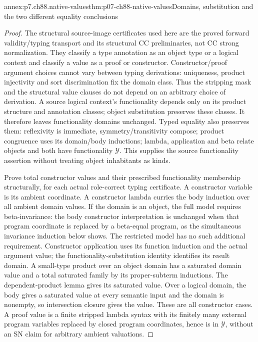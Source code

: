 \begin{annexitem}{annex:p7.ch88.native-values}{thm:p07-ch88-native-values}{Domains, substitution and the two different equality conclusions}
\begin{proof}
The structural source-image certificates used here are the proved
forward validity/typing transport and its structural CC preliminaries,
not CC strong normalization. They classify a type annotation as an
object type or a logical context and classify a value as a proof or
constructor. Constructor/proof argument choices cannot vary between
typing derivations: uniqueness, product injectivity and sort discrimination
fix the domain class. Thus the stripping mask and the structural value
clauses do not depend on an arbitrary choice of derivation. A source
logical context's functionality depends only on its product structure
and annotation classes; object substitution preserves these classes.
It therefore leaves functionality domains unchanged. Typed equality
also preserves them: reflexivity is immediate, symmetry/transitivity
compose; product congruence uses its domain/body inductions; lambda,
application and beta relate objects and both have functionality
\(\mathcal Y\). This supplies the source functionality assertion
without treating object inhabitants as kinds.

Prove total constructor values and their prescribed functionality
membership structurally, for each actual role-correct typing certificate.
A constructor variable is its ambient coordinate. A constructor lambda
curries the body induction over all ambient domain values. If the domain
is an object, the full model requires beta-invariance: the body constructor
interpretation is unchanged when that program coordinate is replaced by
a beta-equal program, as the simultaneous invariance induction below
shows. The restricted model has no such additional requirement. Constructor
application uses its function induction and the actual argument value;
the functionality-substitution identity identifies its result domain.
A small-type product over an object domain has a saturated domain value
and a total saturated family by its proper-subterm inductions. The
dependent-product lemma gives its saturated value. Over a logical domain,
the body gives a saturated value at every semantic input and the domain
is nonempty, so intersection closure gives the value. These are all
constructor cases. A proof value is a finite stripped lambda syntax
with its finitely many external program variables replaced by closed
program coordinates, hence is in \(\mathcal Y\), without an SN claim
for arbitrary ambient valuations.


\end{proof}
\end{annexitem}
